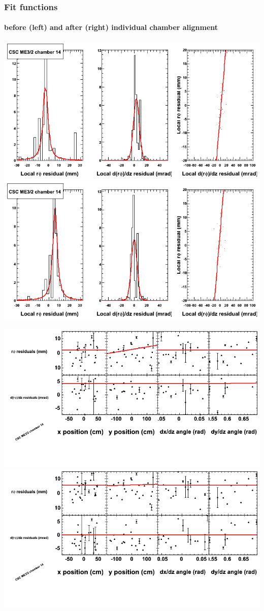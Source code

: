 \documentclass[compress]{beamer}
\begin{document}
\begin{frame}
\frametitle{Fit functions}
\framesubtitle{before (left) and after (right) individual chamber alignment}
\includegraphics[width=0.5\linewidth]{ringfits_3dof/beforefit_MEp32_14_bellcurve.png} \includegraphics[width=0.5\linewidth]{ringfits_3dof/afterfit_MEp32_14_bellcurve.png}

\includegraphics[width=0.5\linewidth]{ringfits_3dof/beforefit_MEp32_14_polynomials.png} \includegraphics[width=0.5\linewidth]{ringfits_3dof/afterfit_MEp32_14_polynomials.png}
\end{frame}
\end{document}

